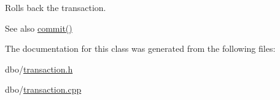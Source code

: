 Rolls back the transaction. 

\begin{DoxySeeAlso}{See also}
\hyperlink{classdbo_1_1transaction_a4cd2f57757397b26e69cefda212fd292}{commit()} 
\end{DoxySeeAlso}


The documentation for this class was generated from the following files\+:\begin{DoxyCompactItemize}
\item 
dbo/\hyperlink{transaction_8h}{transaction.\+h}\item 
dbo/\hyperlink{transaction_8cpp}{transaction.\+cpp}\end{DoxyCompactItemize}
